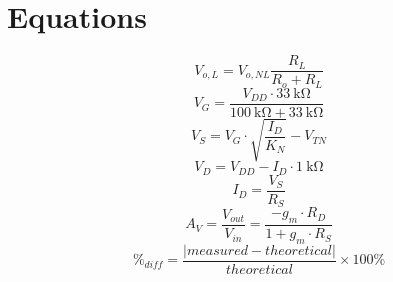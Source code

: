 \section{Equations}
\label{sec:equations}

%
\begin{equation}
  \label{eq:amp}
  V_{o,L} = V_{o,NL} \frac{R_L}{R_o + R_L}
\end{equation}
%
\begin{equation}
  \label{eq:V_G}
  V_G = \frac{V_{DD} \cdot \SI{33}{\kilo\ohm}}{\SI{100}{\kilo\ohm} + \SI{33}{\kilo\ohm}}
\end{equation}
%
\begin{equation}
  \label{eq:V_S}
  V_S = V_G \cdot \sqrt{\frac{I_D}{K_N}} - V_{TN}
\end{equation}
%
\begin{equation}
  \label{eq:V_D}
  V_D = V_{DD} - I_D \cdot \SI{1}{\kilo\ohm}
\end{equation}
%
\begin{equation}
  \label{eq:I_D}
  I_D = \frac{V_S}{R_S}
\end{equation}
%
\begin{equation}
  \label{eq:A_V}
  A_V = \frac{V_{out}}{V_{in}} = \frac{-g_m \cdot R_D}{1 + g_m \cdot R_S}
\end{equation}
%
\begin{equation}
  \label{eqn:percent_diff}
  \%_{diff} = \frac{|measured - theoretical|}{theoretical} \times 100\%
\end{equation}


